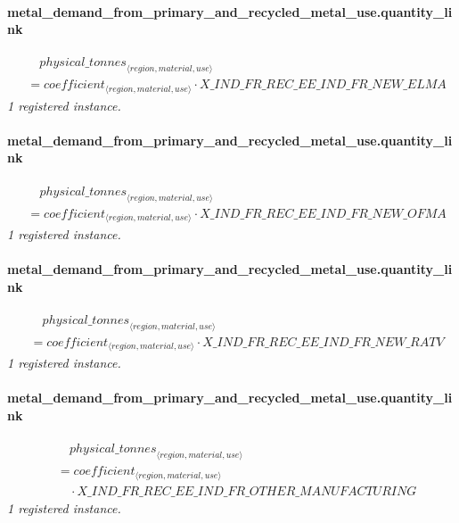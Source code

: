 \documentclass[11pt]{article}
\begin{document}
\paragraph{metal\_demand\_from\_primary\_and\_recycled\_metal\_use.quantity\_link}
\begin{align*}
&\quad {physical\_tonnes}_{\langle region, material, use\rangle}\\
&= coefficient_{\langle region, material, use\rangle} \cdot X\_IND\_FR\_REC\_EE\_IND\_FR\_NEW\_ELMA
\end{align*}
\noindent\emph{1 registered instance.}\par
\paragraph{metal\_demand\_from\_primary\_and\_recycled\_metal\_use.quantity\_link}
\begin{align*}
&\quad {physical\_tonnes}_{\langle region, material, use\rangle}\\
&= coefficient_{\langle region, material, use\rangle} \cdot X\_IND\_FR\_REC\_EE\_IND\_FR\_NEW\_OFMA
\end{align*}
\noindent\emph{1 registered instance.}\par
\paragraph{metal\_demand\_from\_primary\_and\_recycled\_metal\_use.quantity\_link}
\begin{align*}
&\quad {physical\_tonnes}_{\langle region, material, use\rangle}\\
&= coefficient_{\langle region, material, use\rangle} \cdot X\_IND\_FR\_REC\_EE\_IND\_FR\_NEW\_RATV
\end{align*}
\noindent\emph{1 registered instance.}\par
\paragraph{metal\_demand\_from\_primary\_and\_recycled\_metal\_use.quantity\_link}
\begin{align*}
&\quad {physical\_tonnes}_{\langle region, material, use\rangle}\\
&= coefficient_{\langle region, material, use\rangle}\\
&\quad {}\cdot X\_IND\_FR\_REC\_EE\_IND\_FR\_OTHER\_MANUFACTURING
\end{align*}
\noindent\emph{1 registered instance.}\par
\end{document}
